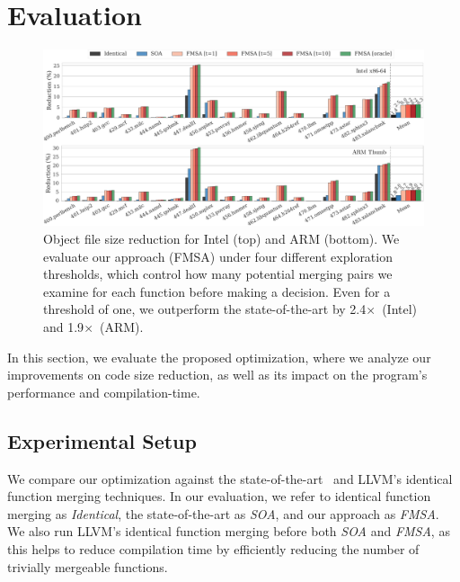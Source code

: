 \section{Evaluation}

\begin{figure}[t!]
  \centering
  \includegraphics[width=\linewidth]{figs/code-size-reduction-spec.pdf}
	\caption{Object file size reduction for Intel (top) and ARM (bottom). We evaluate our approach (FMSA) under four different exploration thresholds, which
      control how many potential merging pairs we examine for each function before making a decision. Even for a threshold of one, we outperform the state-of-the-art
	  by 2.4$\times$~(Intel) and 1.9$\times$~(ARM).}
  \label{fig:reduction-obj}
\end{figure}

In this section, we evaluate the proposed optimization, where we analyze our
improvements on code size reduction, as well as its impact on the program's
performance and compilation-time.

\subsection{Experimental Setup}
We compare our optimization against the state-of-the-art~\cite{edler14}
and LLVM's identical~\cite{llvm-fm} function merging techniques. In our evaluation, we refer to identical function merging as \textit{Identical}, the state-of-the-art as \textit{SOA}, and our
approach as \textit{FMSA}.
We also run LLVM's identical function merging before both \textit{SOA} and \textit{FMSA}, as this helps to reduce
compilation time by efficiently reducing the number of trivially mergeable functions.

